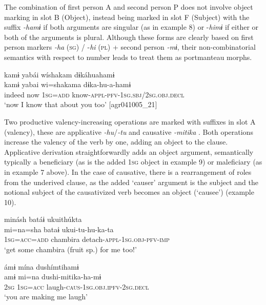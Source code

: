 \documentclass[output=paper]{langscibook}
\begin{document}
The combination of first person A and second person P does not involve object marking in slot B (Object), instead being marked in slot F (Subject) with the suffix \textit{{}-hamɨ} if both arguments are singular (as in example 8) or \nobreakdash-\textit{himɨ} if either or both of the arguments is plural. Although these forms are clearly based on first person markers \textit{\nobreakdash-ha} (\textsc{sg)} \textsc{/} \textsc{\nobreakdash-}\textit{hi} (\textsc{pl}) + second person \textit{\nobreakdash-mɨ}, their non-combinatorial semantics with respect to number leads \citet[244–245]{Overall2017} to treat them as portmanteau morphs.

\ea%
    \label{ex:overall:8}
    \glll kamɨ yabái wíshakam dɨkáhuahamɨ\\
  kamɨ  yabai  wi=shakama  dɨka-hu-a-hamɨ\\
  indeed  now  1\textsc{sg}=\textsc{add}  know-\textsc{appl-pfv-1sg.sbj/2sg.obj.decl}\\
  \glt  ‘now I know that about you too’ [agr041005\_21]
\z

Two productive valency-increasing operations are marked with suffixes in slot A (valency), these are applicative \textit{{}-hu}/\textit{{}-tu} and causative \textit{{}-mitika} . Both operations increase the valency of the verb by one, adding an object to the clause. Applicative derivation straightforwardly adds an object argument, semantically typically a beneficiary (as is the added 1\textsc{sg} object in example 9) or maleficiary (as in example 7 above). In the case of causative, there is a rearrangement of roles from the underived clause, as the added ‘causer’ argument is the subject and the notional subject of the causativized verb becomes an object (‘causee’) (example 10). 

\ea%
    \label{ex:overall:9}
    \glll minásh batáɨ ukuithúkta\\
  mi=na=sha  bataɨ  ukui-tu-hu-ka-ta\\
  1\textsc{sg}=\textsc{acc=add}  chambira  detach-\textsc{appl-1sg.obj-pfv-imp}\\
  \glt  ‘get some chambira (fruit sp.) for me too!’ \citep[302]{Overall2017}
\z

\ea%
    \label{ex:overall:10}
    \glll ámɨ mína dushímtihamɨ\\
  amɨ  mi=na  dushi-mitika-ha-mɨ\\
  2\textsc{sg}  1\textsc{sg}=\textsc{acc}  laugh\textsc{{}-caus-1sg.obj.ipfv-2sg.decl}\\
  \glt  ‘you are making me laugh’ \citep[300]{Overall2017}
\z
\end{document}
